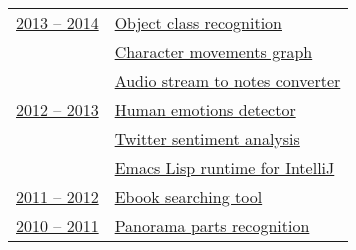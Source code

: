 \documentclass[letterpaper,11pt,oneside]{article}
\begin{document}
\noindent \begin{tabular}{@{} l l}

\underline{2013 -- 2014}     &  \hspace{10mm}\href{https://github.com/ktisha/object_class_recognition}{Object class recognition}  \\
                             &  \hspace{10mm}\href{https://github.com/nunberty/chars-movement-graph}{Character movements graph} \\
                             &  \hspace{10mm}\href{https://github.com/cscenter/uNotes}{Audio stream to notes converter} \vspace{1em} \\                             

\underline{2012 -- 2013}     &  \hspace{10mm}\href{https://github.com/cscenter/DERP}{Human emotions detector}  \\
                             &  \hspace{10mm}\href{http://se.math.spbu.ru/SE/diploma/2014/s/LebedevaEkaterina_Diploma.pdf}{Twitter sentiment analysis} \\
                             &  \hspace{10mm}\href{https://github.com/JetBrains/emacs4ij}{Emacs Lisp runtime for IntelliJ} \vspace{1em} \\                             

\underline{2011 -- 2012}     &  \hspace{10mm}\href{https://code.google.com/archive/p/ebook-service/}{Ebook searching tool} \vspace{1em} \\

\underline{2010 -- 2011}     &  \hspace{10mm}\href{https://github.com/katepol/PanoramaRecognition/}{Panorama parts recognition} \vspace{1em} \\

\end{tabular}
\end{document}
